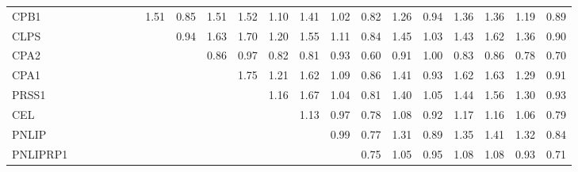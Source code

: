 \begin{longtable}{lrrrrrrrrrrrrrrrrrrrr}
CPB1     &              &              &              &              &             &            &       1.51 &       0.85 &       1.51 &        1.52 &      1.10 &        1.41 &           1.02 &      0.82 &          1.26 &      0.94 &        1.36 &        1.36 &       1.19 &        0.89 \\
CLPS     &              &              &              &              &             &            &            &       0.94 &       1.63 &        1.70 &      1.20 &        1.55 &           1.11 &      0.84 &          1.45 &      1.03 &        1.43 &        1.62 &       1.36 &        0.90 \\
CPA2     &              &              &              &              &             &            &            &            &       0.86 &        0.97 &      0.82 &        0.81 &           0.93 &      0.60 &          0.91 &      1.00 &        0.83 &        0.86 &       0.78 &        0.70 \\
CPA1     &              &              &              &              &             &            &            &            &            &        1.75 &      1.21 &        1.62 &           1.09 &      0.86 &          1.41 &      0.93 &        1.62 &        1.63 &       1.29 &        0.91 \\
PRSS1    &              &              &              &              &             &            &            &            &            &             &      1.16 &        1.67 &           1.04 &      0.81 &          1.40 &      1.05 &        1.44 &        1.56 &       1.30 &        0.93 \\
CEL      &              &              &              &              &             &            &            &            &            &             &           &        1.13 &           0.97 &      0.78 &          1.08 &      0.92 &        1.17 &        1.16 &       1.06 &        0.79 \\
PNLIP    &              &              &              &              &             &            &            &            &            &             &           &             &           0.99 &      0.77 &          1.31 &      0.89 &        1.35 &        1.41 &       1.32 &        0.84 \\
PNLIPRP1 &              &              &              &              &             &            &            &            &            &             &           &             &                &      0.75 &          1.05 &      0.95 &        1.08 &        1.08 &       0.93 &        0.71 \\

\end{longtable}
